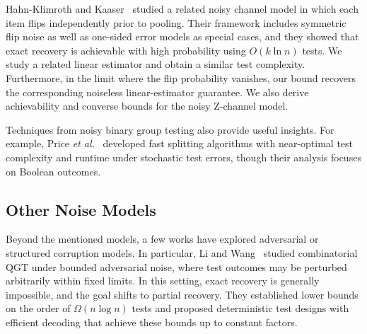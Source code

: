 \documentclass{article}
\begin{document}
Hahn-Klimroth and Kaaser~\cite{hahn-klimroth_distributed_2022} studied a related noisy channel model in which each item flips independently prior to pooling. Their framework includes symmetric flip noise as well as one-sided error models as special cases, and they showed that exact recovery is achievable with high probability using $O(k\ln n)$ tests. We study a related linear estimator and obtain a similar test complexity. Furthermore, in the limit where the flip probability vanishes, our bound recovers the corresponding noiseless linear-estimator guarantee. We also derive achievability and converse bounds for the noisy Z-channel model.

Techniques from noisy binary group testing also provide useful insights. For example, Price \emph{et al.}~\cite{price2022} developed fast splitting algorithms with near-optimal test complexity and runtime under stochastic test errors, though their analysis focuses on Boolean outcomes.

\subsection{Other Noise Models}

Beyond the mentioned models, a few works have explored adversarial or structured corruption models.
In particular, Li and Wang~\cite{li_wang_2021} studied combinatorial QGT under bounded adversarial noise, where test outcomes may be perturbed arbitrarily within fixed limits.
In this setting, exact recovery is generally impossible, and the goal shifts to partial recovery.
They established lower bounds on the order of $\Omega(n\log n)$ tests and proposed deterministic test designs with efficient decoding that achieve these bounds up to constant factors.
\end{document}
